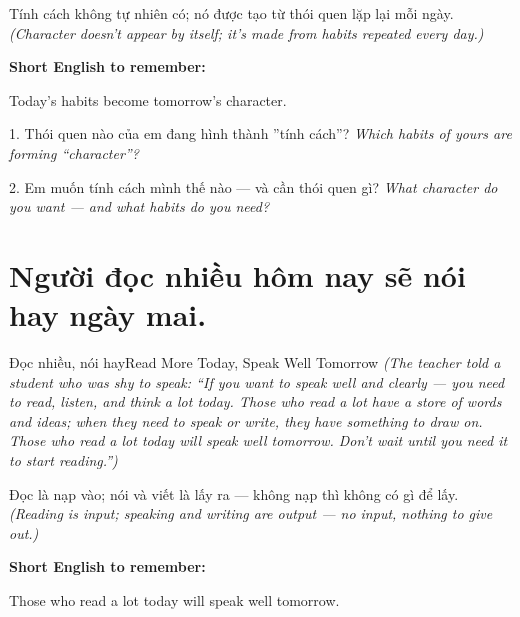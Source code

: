 \begin{baihoc}
Tính cách không tự nhiên có; nó được tạo từ thói quen lặp lại mỗi ngày.
\textit{(Character doesn't appear by itself; it's made from habits repeated every day.)}
\end{baihoc}

\begin{ghinhoanh}
\textbf{Short English to remember:}

Today's habits become tomorrow's character.

\end{ghinhoanh}

\begin{tuhocnhanh}
1. Thói quen nào của em đang hình thành ''tính cách''? \textit{Which habits of yours are forming ``character''?}

2. Em muốn tính cách mình thế nào — và cần thói quen gì? \textit{What character do you want — and what habits do you need?}
\end{tuhocnhanh}
\ngancach

\section{Người đọc nhiều hôm nay sẽ nói hay ngày mai.}
\begin{truyen}{Đọc nhiều, nói hay}{Read More Today, Speak Well Tomorrow}
\textit{(The teacher told a student who was shy to speak: ``If you want to speak well and clearly — you need to read, listen, and think a lot today. Those who read a lot have a store of words and ideas; when they need to speak or write, they have something to draw on. Those who read a lot today will speak well tomorrow. Don't wait until you need it to start reading.'')}
\end{truyen}

\begin{baihoc}
Đọc là nạp vào; nói và viết là lấy ra — không nạp thì không có gì để lấy.
\textit{(Reading is input; speaking and writing are output — no input, nothing to give out.)}
\end{baihoc}

\begin{ghinhoanh}
\textbf{Short English to remember:}

Those who read a lot today will speak well tomorrow.

\end{ghinhoanh}

